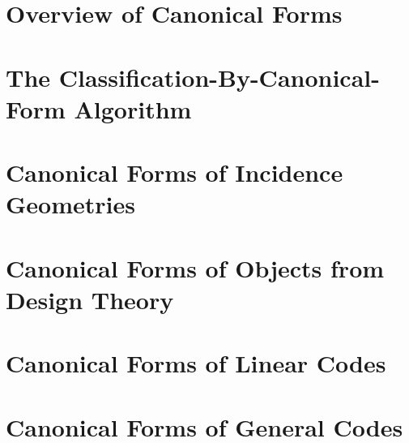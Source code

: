 
\section{Overview of Canonical Forms}
\label{sec:canonical:form:overview}



	

\bigskip


\clearpage




\section{The Classification-By-Canonical-Form Algorithm}
\label{sec:canonical:form:objects:PG}



	

\bigskip


\clearpage

\section{Canonical Forms of Incidence Geometries}
\label{sec:canonical:form:objects:incidence:geometries}





\bigskip


\clearpage


\section{Canonical Forms of Objects from Design Theory}
\label{sec:canonical:form:objects:design:theory}





\bigskip


\clearpage


\section{Canonical Forms of Linear Codes}
\label{sec:canonical:form:objects:linear:codes}





\bigskip


\clearpage

\section{Canonical Forms of General Codes}
\label{sec:canonical:form:objects:general:codes}


